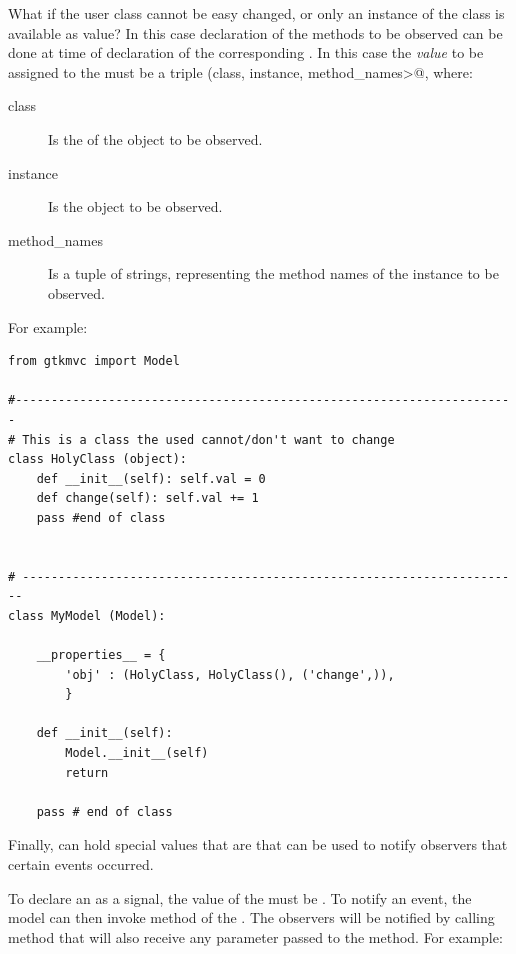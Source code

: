 \vspace{4mm}
What if the user class cannot be easy changed, or only an instance of
the class is available as \OP value? In this case declaration of the
methods to be observed can be done at time of declaration of the
corresponding \OP. In this case the \emph{value} to be assigned to the
\OP must be a triple \verb@(class, instance, method_names>@, where:
\begin{description}
\item[class] Is the  of the object to be observed.
\item[instance] Is the object to be observed.
\item[method\_names] Is a tuple of strings, representing the method
  names of the instance to be observed.
\end{description}

For example:
{ \codesize 
\begin{verbatim} 
from gtkmvc import Model

#----------------------------------------------------------------------
# This is a class the used cannot/don't want to change
class HolyClass (object):    
    def __init__(self): self.val = 0 
    def change(self): self.val += 1
    pass #end of class


# ----------------------------------------------------------------------
class MyModel (Model):

    __properties__ = {
        'obj' : (HolyClass, HolyClass(), ('change',)),
        }

    def __init__(self):
        Model.__init__(self)
        return    

    pass # end of class
\end{verbatim}
}



\vspace{4mm}
Finally, \OP can hold special values that are  that can be
used to notify observers that certain events occurred. 

To declare an \OP as a signal, the value of the \OP must be
. To notify an event, the model
can then invoke method  of the \OP. The observers will
be notified by calling method
 that will also receive any
parameter passed to the  method. For example:

